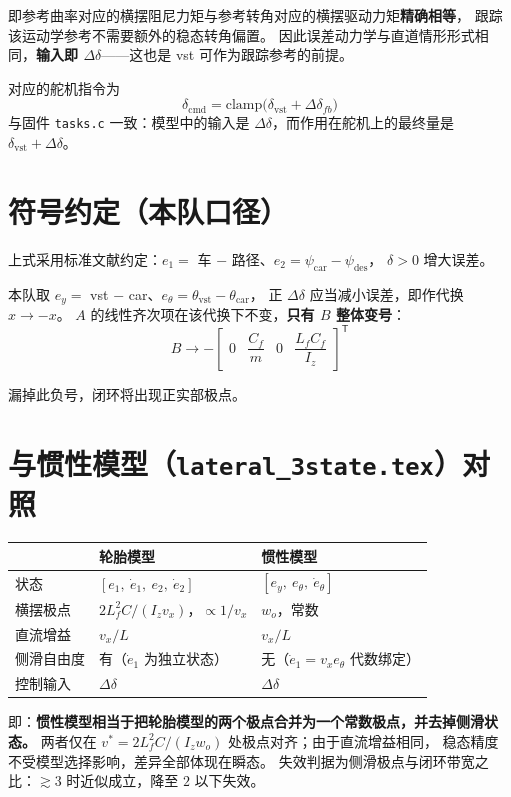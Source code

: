 \documentclass[11pt,a4paper]{article}
\begin{document}
即参考曲率对应的横摆阻尼力矩与参考转角对应的横摆驱动力矩\textbf{精确相等}，
跟踪该运动学参考不需要额外的稳态转角偏置。
因此误差动力学与直道情形形式相同，\textbf{输入即 $\Delta\delta$}——这也是 vst 可作为跟踪参考的前提。

对应的舵机指令为
\begin{equation}
\delta_{\text{cmd}} = \mathrm{clamp}\big(\delta_{\text{vst}} + \Delta\delta_{fb}\big)
\end{equation}
与固件 \texttt{tasks.c} 一致：模型中的输入是 $\Delta\delta$，而作用在舵机上的最终量是 $\delta_{\text{vst}} + \Delta\delta$。

\section{符号约定（本队口径）}

上式采用标准文献约定：$e_1 = $ 车 $-$ 路径、$e_2 = \psi_{\text{car}} - \psi_{\text{des}}$，
$\delta > 0$ 增大误差。

本队取 $e_y = $ vst $-$ car、$e_\theta = \theta_{\text{vst}} - \theta_{\text{car}}$，
正 $\Delta\delta$ 应当减小误差，即作代换 $x \to -x$。
$A$ 的线性齐次项在该代换下不变，\textbf{只有 $B$ 整体变号}：
\begin{equation}
B \to -\begin{bmatrix} 0 & \dfrac{C_f}{m} & 0 & \dfrac{L_f C_f}{I_z} \end{bmatrix}^{\mathsf T}
\end{equation}

漏掉此负号，闭环将出现正实部极点。

\section{与惯性模型（\texttt{lateral\_3state.tex}）对照}

\begin{center}
\begin{tabular}{lll}
\toprule
 & 轮胎模型 & 惯性模型 \\
\midrule
状态 & $[e_1,\ \dot e_1,\ e_2,\ \dot e_2]$ & $[e_y,\ e_\theta,\ \dot e_\theta]$ \\
横摆极点 & $2 L_f^2 C/(I_z v_x)$，$\propto 1/v_x$ & $w_o$，常数 \\
直流增益 & $v_x / L$ & $v_x / L$ \\
侧滑自由度 & 有（$\dot e_1$ 为独立状态） & 无（$\dot e_1 = v_x e_\theta$ 代数绑定） \\
控制输入 & $\Delta\delta$ & $\Delta\delta$ \\
\bottomrule
\end{tabular}
\end{center}

即：\textbf{惯性模型相当于把轮胎模型的两个极点合并为一个常数极点，并去掉侧滑状态。}
两者仅在 $v^* = 2 L_f^2 C/(I_z w_o)$ 处极点对齐；由于直流增益相同，
稳态精度不受模型选择影响，差异全部体现在瞬态。
失效判据为侧滑极点与闭环带宽之比：$\gtrsim 3$ 时近似成立，降至 $2$ 以下失效。
\end{document}
